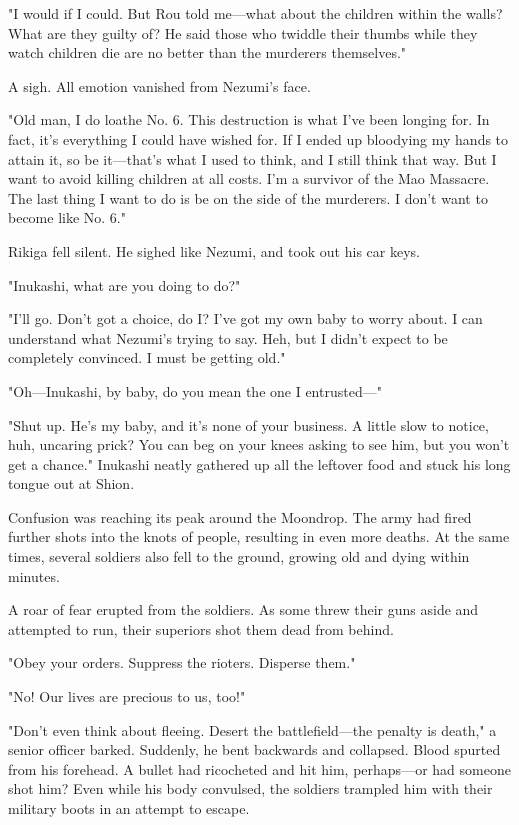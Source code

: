 "I would if I could. But Rou told me---what about the children within the
walls? What are they guilty of? He said those who twiddle their thumbs
while they watch children die are no better than the murderers
themselves."

A sigh. All emotion vanished from Nezumi's face.

"Old man, I do loathe No. 6. This destruction is what I've been longing
for. In fact, it's everything I could have wished for. If I ended up
bloodying my hands to attain it, so be it---that's what I used to think,
and I still think that way. But I want to avoid killing children at all
costs. I'm a survivor of the Mao Massacre. The last thing I want to do
is be on the side of the murderers. I don't want to become like No. 6."

Rikiga fell silent. He sighed like Nezumi, and took out his car keys.

"Inukashi, what are you doing to do?"

"I'll go. Don't got a choice, do I? I've got my own baby to worry about.
I can understand what Nezumi's trying to say. Heh, but I didn't expect
to be completely convinced. I must be getting old."

"Oh---Inukashi, by baby, do you mean the one I entrusted---"

"Shut up. He's my baby, and it's none of your business. A little slow to
notice, huh, uncaring prick? You can beg on your knees asking to see
him, but you won't get a chance." Inukashi neatly gathered up all the
leftover food and stuck his long tongue out at Shion.

\mybreak

Confusion was reaching its peak around the Moondrop. The army had fired
further shots into the knots of people, resulting in even more deaths.
At the same times, several soldiers also fell to the ground, growing old
and dying within minutes.

A roar of fear erupted from the soldiers. As some threw their guns aside
and attempted to run, their superiors shot them dead from behind.

"Obey your orders. Suppress the rioters. Disperse them."

"No! Our lives are precious to us, too!"

"Don't even think about fleeing. Desert the battlefield---the penalty is
death," a senior officer barked. Suddenly, he bent backwards and
collapsed. Blood spurted from his forehead. A bullet had ricocheted and
hit him, perhaps---or had someone shot him? Even while his body convulsed,
the soldiers trampled him with their military boots in an attempt to
escape.

